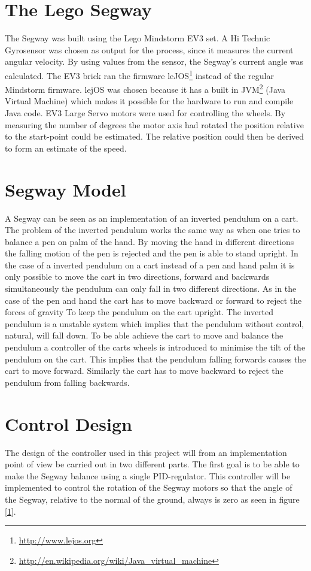  \section{The Lego Segway}
 The Segway was built using the Lego Mindstorm EV3 set. A Hi Technic Gyrosensor was chosen as output for the process, since it measures the current angular velocity. By using values from the sensor, the Segway's current angle was calculated. The EV3 brick ran the firmware leJOS\footnote{\url{http://www.lejos.org}} instead of the regular Mindstorm firmware. lejOS was chosen because it has a built in JVM\footnote{\url{http://en.wikipedia.org/wiki/Java_virtual_machine}} (Java Virtual Machine) which makes it possible for the hardware to run and compile Java code. EV3 Large Servo motors were used for controlling the wheels. By measuring the number of degrees the motor axis had rotated the position relative to the start-point could be estimated. The relative position could then be derived to form an estimate of the speed. 

\section{Segway Model}
A Segway can be seen as an implementation of an inverted pendulum on a cart. The problem of the inverted pendulum works the same way as when one tries to balance a pen on palm of the hand. By moving the hand in different directions the falling motion of the pen is rejected and the pen is able to stand upright. In the case of a inverted pendulum on a cart instead of a pen and hand palm it is only possible to move the cart in two directions, forward and backwards simultaneously the pendulum can only fall in two different directions. As in the case of the pen and hand the cart has to move backward or forward to reject the forces of gravity To keep the pendulum on the cart upright. The inverted pendulum is a unstable system which implies that the pendulum without control, natural, will fall down. To be able achieve the cart to move and balance the pendulum a controller of the carts wheels is introduced to minimise the tilt of the pendulum on the cart. This implies that the pendulum falling forwards causes the cart to move forward. Similarly the cart has to move backward to reject the pendulum from falling backwards. 


\section{Control Design}
The design of the controller used in this project will from an implementation point of view  be carried out in two different parts. 
The first goal is to be able to make the Segway balance using a single PID-regulator. This controller will be implemented to control the rotation of the Segway motors so that the angle of the Segway, relative to the normal of the ground, always is zero as seen in figure \ref{1}.

